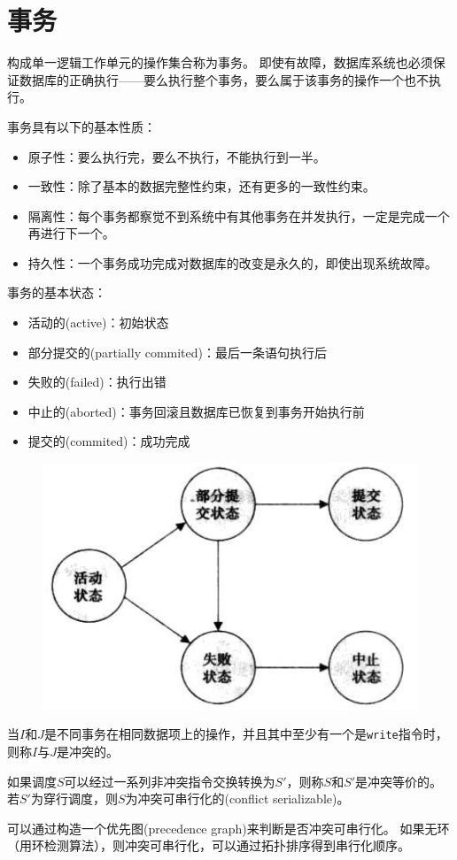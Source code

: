 
\section{事务}
\begin{definition}[事务(transaction)]
构成单一逻辑工作单元的操作集合称为事务。
即使有故障，数据库系统也必须保证数据库的正确执行——要么执行整个事务，要么属于该事务的操作一个也不执行。
\end{definition}

事务具有以下的基本性质：
\begin{itemize}
	\item 原子性：要么执行完，要么不执行，不能执行到一半。
	\item 一致性：除了基本的数据完整性约束，还有更多的一致性约束。
	\item 隔离性：每个事务都察觉不到系统中有其他事务在并发执行，一定是完成一个再进行下一个。
	\item 持久性：一个事务成功完成对数据库的改变是永久的，即使出现系统故障。
\end{itemize}

事务的基本状态：
\begin{itemize}
	\item 活动的(active)：初始状态
	\item 部分提交的(partially commited)：最后一条语句执行后
	\item 失败的(failed)：执行出错
	\item 中止的(aborted)：事务回滚且数据库已恢复到事务开始执行前
	\item 提交的(commited)：成功完成
\end{itemize}
\begin{figure}[H]
\centering
\includegraphics[width=0.5\linewidth]{transaction_state.png}
\end{figure}

\begin{definition}[冲突]
当$I$和$J$是不同事务在相同数据项上的操作，并且其中至少有一个是\verb'write'指令时，则称$I$与$J$是冲突的。
\end{definition}
\begin{definition}
如果调度$S$可以经过一系列非冲突指令交换转换为$S'$，则称$S$和$S'$是冲突等价的。
若$S'$为穿行调度，则$S$为冲突可串行化的(conflict serializable)。
\end{definition}

可以通过构造一个优先图(precedence graph)来判断是否冲突可串行化。
如果无环（用环检测算法），则冲突可串行化，可以通过拓扑排序得到串行化顺序。